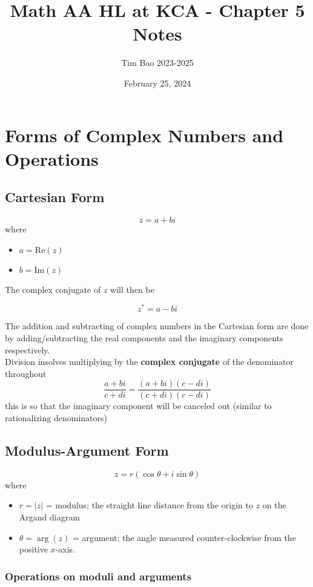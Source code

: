 \documentclass[11pt]{article}
\title{Math AA HL at KCA - Chapter 5 Notes}
\author{Tim Bao 2023-2025}
\date{February 25, 2024}
\newcommand{\lb}{\\[8pt]}
\begin{document}
\maketitle
\pagebreak

\section{Forms of Complex Numbers and Operations}

\subsection{Cartesian Form}

$$z = a + bi$$
where
\begin{itemize}
  \item $a = \text{Re}{(z)}$
  \item $b = \text{Im}{(z)}$
\end{itemize}

\noindent The complex conjugate of $z$ will then be

$$z^* = a - bi$$

\noindent The addition and subtracting of complex numbers in the Cartesian form are done by adding/subtracting the real components and the imaginary components respectively.\lb
Division insolves multiplying by the \textbf{complex conjugate} of the denominator throughout
$$\frac{a + bi}{c + di} = \frac{(a + bi)(c - di)}{(c + di)(c - di)}$$ this is so that the imaginary component will be canceled out (similar to rationalizing denominators)

\pagebreak

\subsection{Modulus-Argument Form}

$$z = r\left(\cos\theta + i\sin\theta\right)$$
where
\begin{itemize}
  \item $r = |z|$ = modulus; the straight line distance from the origin to $z$ on the Argand diagram
  \item $\theta = \arg(z)$ = argument; the angle measured counter-clockwise from the positive $x$-axis.
\end{itemize}

\subsubsection*{Operations on moduli and arguments}
\end{document}
